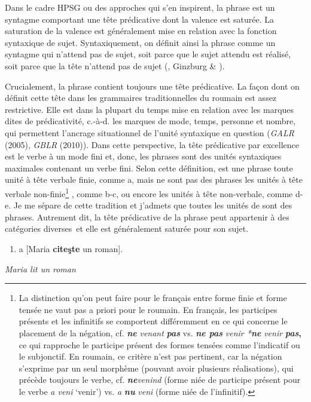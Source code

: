 Dans le cadre HPSG ou des approches qui s'en inspirent, la phrase est un syntagme comportant une tête prédicative dont la valence est saturée. La saturation de la valence est généralement mise en relation avec la fonction syntaxique de sujet. Syntaxiquement, on définit ainsi la phrase comme un syntagme qui n'attend pas de sujet, soit parce que le sujet attendu est réalisé, soit parce que la tête n'attend pas de sujet (\citet{Sag1997}, Ginzburg \& \citet{Sag2000}). 

Crucialement, la phrase contient toujours une tête prédicative. La façon dont on définit cette tête dans les grammaires traditionnelles du roumain est assez restrictive. Elle est dans la plupart du temps mise en relation avec les marques dites de prédicativité, c.-à-d. les marques de mode, temps, personne et nombre, qui permettent l'ancrage situationnel de l'unité syntaxique en question (\textit{GALR} (2005), \textit{GBLR} (2010)). Dans cette perspective, la tête prédicative par excellence est le verbe à un mode fini et, donc, les phrases sont des unités syntaxiques maximales contenant un verbe fini. Selon cette définition, est une phrase toute unité à tête verbale finie, comme a, mais ne sont pas des phrases les unités à tête verbale non-finie\footnote{La distinction qu'on peut faire pour le français entre forme finie et forme tensée ne vaut pas a priori pour le roumain. En français, les participes présents et les infinitifs se comportent différemment en ce qui concerne le placement de la négation, cf. \textbf{\textit{ne}}\textit{ venant} \textbf{\textit{pas}} vs. \textbf{\textit{ne pas}}\textit{ venir {\textbar} *}\textbf{\textit{ne}}\textit{ venir} \textbf{\textit{pas}}\textbf{,} ce qui rapproche le participe présent des formes tensées comme l'indicatif ou le subjonctif. En roumain, ce critère n'est pas pertinent, car la négation s'exprime par un seul morphème (pouvant avoir plusieurs réalisations), qui précède toujours le verbe, cf. \textbf{\textit{ne}}\textit{venind} (forme niée de participe présent pour le verbe \textit{a veni} `venir') vs. \textit{a} \textbf{\textit{nu}}\textit{ veni} (forme niée de l'infinitif).} , comme b-c, ou encore les unités à tête non-verbale, comme d-e. Je me sépare de cette tradition et j'admets que toutes les unités de  sont des phrases. Autrement dit, la tête prédicative de la phrase peut appartenir à des catégories diverses~et elle est généralement saturée pour son sujet.


\begin{enumerate}
\item \label{bkm:Ref283825287}a  [Maria \textbf{citeşte} un roman].


\end{enumerate}
{\itshape
Maria lit un roman}

